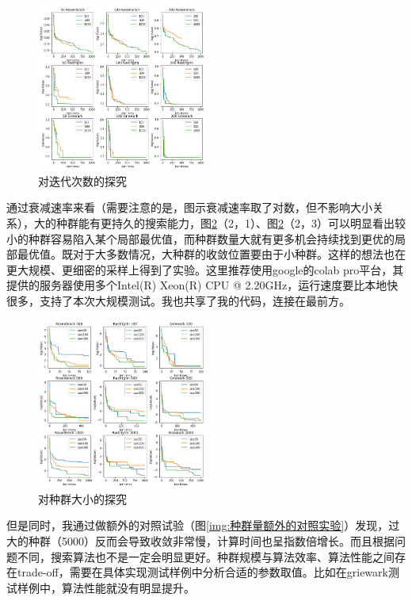 \documentclass[lang=cn,11pt]{elegantpaper}
\begin{document}
\begin{figure}[h]
  \centering
  \includegraphics[width=0.5\textwidth]{figure/PSO/对迭代次数的探究.png} %
  \caption{对迭代次数的探究} %
  \label{img:对迭代次数的探究}
\end{figure}

通过衰减速率来看（需要注意的是，图示衰减速率取了对数，但不影响大小关系），大的种群能有更持久的搜索能力，图\ref{img:对种群大小的探究}（2，1）、图\ref{img:对种群大小的探究}（2，3）可以明显看出较小的种群容易陷入某个局部最优值，而种群数量大就有更多机会持续找到更优的局部最优值。既对于大多数情况，大种群的收敛位置要由于小种群。这样的想法也在更大规模、更细密的采样上得到了实验。这里推荐使用google的colab pro平台，其提供的服务器使用多个Intel(R) Xeon(R) CPU @ 2.20GHz，运行速度要比本地快很多，支持了本次大规模测试。我也共享了我的代码，连接在最前方。
\begin{figure}[h!t]
  \centering
  \includegraphics[width=0.5\textwidth]{figure/PSO/对种群大小的探究.png} %
  \caption{对种群大小的探究} %
  \label{img:对种群大小的探究}
\end{figure}


但是同时，我通过做额外的对照试验（图\ref{img:种群量额外的对照实验}）发现，过大的种群（5000）反而会导致收敛非常慢，计算时间也呈指数倍增长。而且根据问题不同，搜索算法也不是一定会明显更好。种群规模与算法效率、算法性能之间存在trade-off，需要在具体实现测试样例中分析合适的参数取值。比如在griewark测试样例中，算法性能就没有明显提升。
\end{document}
